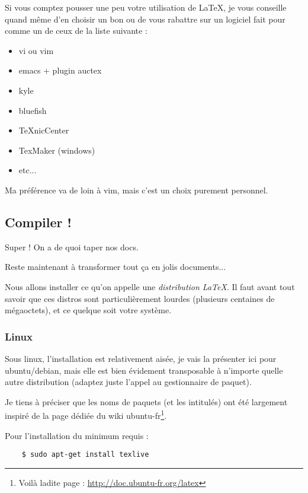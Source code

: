 Si vous comptez pousser une peu votre utilisation de \LaTeX, je vous conseille quand même d'en choisir un bon ou de vous rabattre sur un logiciel fait pour comme un de ceux de la liste suivante :

\begin{itemize}
    \item vi ou vim
    \item emacs + plugin auctex
    \item kyle
    \item bluefish
    \item \TeX nicCenter
    \item TexMaker (windows)
    \item etc...
\end{itemize}

Ma préférence va de loin à vim, mais c'est un choix purement personnel.


\subsection{Compiler !} %
\label{sub:Compiler !}

Super ! On a de quoi taper nos docs.

Reste maintenant à transformer tout ça en jolis documents...

Nous allons installer ce qu'on appelle une {\itshape distribution \LaTeX}.
Il faut avant tout savoir que ces distros sont particulièrement lourdes (plusieurs centaines de mégaoctets), et ce quelque soit votre système.

\subsubsection{Linux} %
\label{ssub:Linux}

Sous linux, l'installation est relativement aisée, je vais la présenter ici pour ubuntu/debian, mais elle est bien évidement transposable à n'importe quelle autre distribution (adaptez juste l'appel au gestionnaire de paquet).

Je tiens à préciser que les noms de paquets (et les intitulés) ont été largement inspiré de la page dédiée du wiki ubuntu-fr\footnote{Voilà ladite page : \url{http://doc.ubuntu-fr.org/latex}}.

Pour l'installation du minimum requis :
\begin{verbatim}
    $ sudo apt-get install texlive
\end{verbatim}

